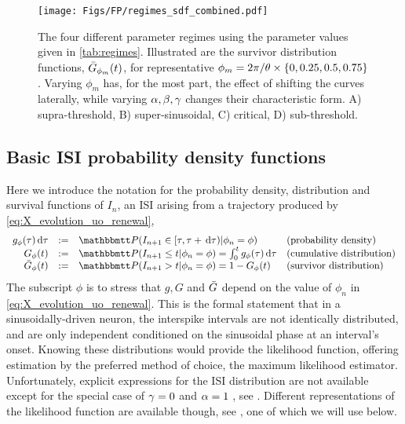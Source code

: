 \begin{figure}[ht]    
\begin{center} 
\texttt{[image: Figs/FP/regimes\_sdf\_combined.pdf]}
\caption{The four different parameter regimes using the parameter values given in
\cref{tab:regimes}. Illustrated are the survivor
distribution functions, ${ \bar{G} }_{\phi_m}(t)$, for representative $\phi_m = 2\pi/{ \theta}
\times \{0,0.25,0.5,0.75\}$. Varying $\phi_m$ has, for the most part, the effect
of shifting the curves laterally, while varying ${\alpha,\beta,{\gamma } }$ changes their
characteristic form.
A) supra-threshold, B) super-sinusoidal, C) critical, D) sub-threshold.}
\label{fig:4regimes_illustrated_SDF}    
\end{center}
\end{figure}     

\clearpage

\subsection{Basic ISI probability density functions}
Here we introduce the notation for the  probability density, distribution and
survival functions of $I_n$, an ISI arising from a trajectory
produced by \cref{eq:X_evolution_uo_renewal},
\begin{equation} 
\begin{array}{rcll}
g_{\phi}(\t) \intd{\t} &:=& \Prob(I_{n+1} \in [\t, \t + \intd{\t})  | \phi_n =
\phi) &
 \textrm{(probability density)} 
\\ 
G_{\phi}(t) &:=& \Prob(I_{n+1} \leq t  |\phi_n = \phi ) = \int_0^t g_{\phi}(\t)
\intd{\t} &
 \textrm{(cumulative distribution)}
\\
\G_{\phi}(t) &:= & \Prob(I_{n+1}>t | \phi_n = \phi ) = 1 - G_{\phi}(t)
&
 \textrm{(survivor distribution)}
\end{array}
\label{eq:ISI_distribution_functions}
\end{equation}
The subscript $\phi$ is to stress that $g, G$ and ${ \bar{G} }$ depend on the value of
$\phi_n$ in \cref{eq:X_evolution_uo_renewal}. This is the formal statement that
in a sinusoidally-driven neuron, the interspike intervals are not identically
distributed, and are only independent conditioned on the sinusoidal phase at an
interval's onset. Knowing these distributions would provide the likelihood function,
offering estimation by the preferred method of choice, the maximum likelihood
estimator. Unfortunately, explicit expressions for the ISI distribution are not
available except for the special case of ${\gamma } = 0$ and $\alpha=1$ , see
\cite{DitlevsenLansky2005}. Different representations of the likelihood function
are available though, see \cite{Alili2005}, one of which we will use below.

